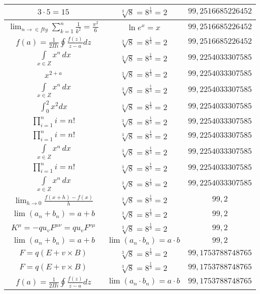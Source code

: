 \documentclass{article}
\begin{document}
\begin{flushleft}
\begin{longtable}{|c|c|c|}
$3\cdot 5=15$ & $\sqrt[3]{8}=8^{\frac{1}{3}}=2$ & $99,2516685226452$ \\ \hline 
$\lim_{n\to\in fty}\sum_{k=1}^n\frac{1}{k^2}=\frac{\pi^2}{6}$ & $\ln e^x=x$ & $99,2516685226452$ \\ \hline 
$f\left(a\right)=\frac{1}{2\Pi i}\oint\frac{f\left(z\right)}{z-a}dz$ & $\sqrt[3]{8}=8^{\frac{1}{3}}=2$ & $99,2516685226452$ \\ \hline 
$\int \limits_{x\in Z}\!x^{n}\,dx$ & $\sqrt[3]{8}=8^{\frac{1}{3}}=2$ & $99,2254033307585$ \\ \hline 
$x^{2+a}$ & $\sqrt[3]{8}=8^{\frac{1}{3}}=2$ & $99,2254033307585$ \\ \hline 
$\int \limits_{x\in Z}\!x^{n}\,dx$ & $\sqrt[3]{8}=8^{\frac{1}{3}}=2$ & $99,2254033307585$ \\ \hline 
$\int _0^2x^2dx$ & $\sqrt[3]{8}=8^{\frac{1}{3}}=2$ & $99,2254033307585$ \\ \hline 
$\prod_{i=1}^ni=n!$ & $\sqrt[3]{8}=8^{\frac{1}{3}}=2$ & $99,2254033307585$ \\ \hline 
$\prod_{i=1}^ni=n!$ & $\sqrt[3]{8}=8^{\frac{1}{3}}=2$ & $99,2254033307585$ \\ \hline 
$\int \limits_{x\in Z}\!x^{n}\,dx$ & $\sqrt[3]{8}=8^{\frac{1}{3}}=2$ & $99,2254033307585$ \\ \hline 
$\prod_{i=1}^ni=n!$ & $\sqrt[3]{8}=8^{\frac{1}{3}}=2$ & $99,2254033307585$ \\ \hline 
$\int \limits_{x\in Z}\!x^{n}\,dx$ & $\sqrt[3]{8}=8^{\frac{1}{3}}=2$ & $99,2254033307585$ \\ \hline 
$\lim_{h\to0}\frac{f(x+h)-f(x)}{h}$ & $\sqrt[3]{8}=8^{\frac{1}{3}}=2$ & $99,2$ \\ \hline 
$\lim\left(a_n+b_n\right)=a+b$ & $\sqrt[3]{8}=8^{\frac{1}{3}}=2$ & $99,2$ \\ \hline 
$K^\mu=-qu_vF^{\mu\nu}=qu_vF^{\nu\mu}$ & $\sqrt[3]{8}=8^{\frac{1}{3}}=2$ & $99,2$ \\ \hline 
$\lim\left(a_n+b_n\right)=a+b$ & $\lim\left(a_n\cdot b_n\right)=a\cdot b$ & $99,2$ \\ \hline 
$F=q\left(E+v\times B\right)$ & $\sqrt[3]{8}=8^{\frac{1}{3}}=2$ & $99,1753788748765$ \\ \hline 
$F=q\left(E+v\times B\right)$ & $\sqrt[3]{8}=8^{\frac{1}{3}}=2$ & $99,1753788748765$ \\ \hline 
$f\left(a\right)=\frac{1}{2\Pi i}\oint\frac{f\left(z\right)}{z-a}dz$ & $\lim\left(a_n\cdot b_n\right)=a\cdot b$ & $99,1753788748765$ \\ \hline 

\end{longtable}
\end{flushleft}
\end{document}
